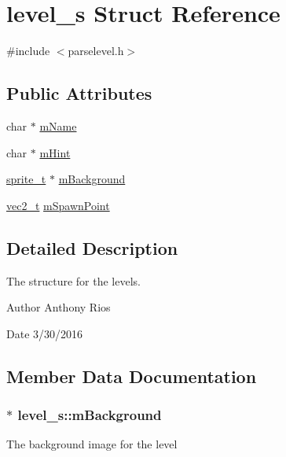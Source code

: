 \hypertarget{structlevel__s}{}\section{level\+\_\+s Struct Reference}
\label{structlevel__s}


{\ttfamily \#include $<$parselevel.\+h$>$}

\subsection*{Public Attributes}
\begin{DoxyCompactItemize}
\item 
char $\ast$ \hyperlink{structlevel__s_a103166c16bb1f8aa50a13d3fd047fe03}{m\+Name}
\item 
char $\ast$ \hyperlink{structlevel__s_a9243daa853e29f529a7004ff134ee7e4}{m\+Hint}
\item 
\hyperlink{graphics_8h_a5371414b10358aeda7c6bcec8196342f}{sprite\+\_\+t} $\ast$ \hyperlink{structlevel__s_a9184c58949d5bf2f17b82e7a625eb2e3}{m\+Background}
\item 
\hyperlink{globals_8h_a773f2054819bb6014f1e50baa39cb5e3}{vec2\+\_\+t} \hyperlink{structlevel__s_a40b9aa1cc3812e64a8d357e732d9844b}{m\+Spawn\+Point}
\end{DoxyCompactItemize}


\subsection{Detailed Description}
The structure for the levels.

\begin{DoxyAuthor}{Author}
Anthony Rios 
\end{DoxyAuthor}
\begin{DoxyDate}{Date}
3/30/2016 
\end{DoxyDate}


\subsection{Member Data Documentation}
\subsubsection[{\texorpdfstring{m\+Background}{mBackground}}]{$\ast$ level\+\_\+s\+::m\+Background}\hypertarget{structlevel__s_a9184c58949d5bf2f17b82e7a625eb2e3}{}\label{structlevel__s_a9184c58949d5bf2f17b82e7a625eb2e3}
The background image for the level 
